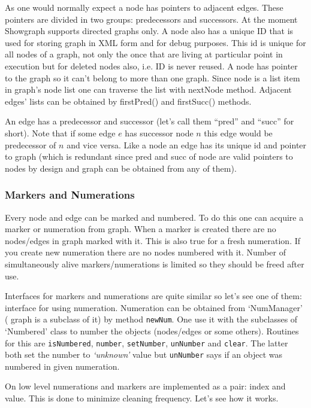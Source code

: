 \documentclass[11pt,twoside,a4paper]{article}
\begin{document}
As one would normally expect a node has pointers to adjacent edges. These pointers are divided in two groups: predecessors and successors. At the moment Showgraph supports directed graphs only. A node also has a unique ID that is used for storing graph in XML form and for debug purposes. This id is unique for all nodes of a graph, not only the once that are living at particular point in execution but for deleted nodes also, i.e. ID is never reused. A node has pointer to the graph so it can't belong to more than one graph. Since node is a list item in graph's node list one can traverse the list with nextNode method. Adjacent edges' lists can be obtained by firstPred() and firstSucc() methods.

An edge has a predecessor and successor (let's call them ``pred'' and ``succ'' for short). Note that if some edge $e$ has successor node $n$ this edge would be predecessor of $n$ and vice versa. Like a node an edge has its unique id and pointer to graph (which is redundant since pred and succ of node are valid pointers to nodes by design and graph can be obtained from any of them).

\subsubsection{Markers and Numerations}
Every node and edge can be marked and numbered. To do this one can acquire a marker or numeration from graph. When a marker is created there are no nodes/edges in graph marked with it. This is also true for a fresh numeration. If you create new numeration there are no nodes numbered with it. Number of simultaneously alive markers/numerations is limited so they should be freed after use.

Interfaces for markers and numerations are quite similar so let's see one of them: interface for using numeration. Numeration can be obtained from `NumManager' ( graph is a subclass of it) by method \lstinline{newNum}. One use it with the subclasses of `Numbered' class to number the objects (nodes/edges or some others). Routines for this are \lstinline{isNumbered}, \lstinline{number}, \lstinline{setNumber}, \lstinline{unNumber} and \lstinline{clear}. The latter both set the number to \emph{`unknown'} value but \lstinline{unNumber} says if an object was numbered in given numeration.

On low level numerations and markers are implemented as a pair: index and value. This is done to minimize cleaning frequency. Let's see how it works.
\end{document}
